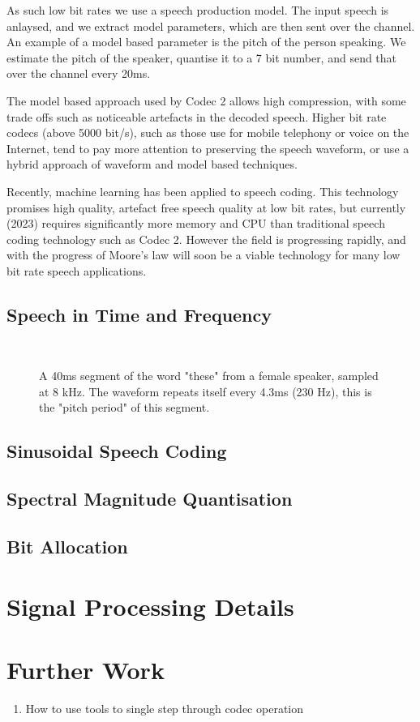 \documentclass{article}
\begin{document}
As such low bit rates we use a speech production model.  The input speech is anlaysed, and we extract model parameters, which are then sent over the channel.  An example of a model based parameter is the pitch of the person speaking.  We estimate the pitch of the speaker, quantise it to a 7 bit number, and send that over the channel every 20ms.

The model based approach used by Codec 2 allows high compression, with some trade offs such as noticeable artefacts in the decoded speech.  Higher bit rate codecs (above 5000 bit/s), such as those use for mobile telephony or voice on the Internet, tend to pay more attention to preserving the speech waveform, or use a hybrid approach of waveform and model based techniques.

Recently, machine learning has been applied to speech coding.  This technology promises high quality, artefact free speech quality at low bit rates, but currently (2023) requires significantly more memory and CPU than traditional speech coding technology such as Codec 2.  However the field is progressing rapidly, and with the progress of Moore's law will soon be a viable technology for many low bit rate speech applications.

\subsection{Speech in Time and Frequency}

\begin{figure}
\caption{ A 40ms segment of the word "these" from a female speaker, sampled at 8 kHz. The waveform repeats itself every 4.3ms (230 Hz), this is the "pitch period" of this segment.}
\label{fig:hts2a_time}
\begin{center}

\\

\end{center}
\end{figure}

\subsection{Sinusoidal Speech Coding}

\subsection{Spectral Magnitude Quantisation}

\subsection{Bit Allocation}

\section{Signal Processing Details}
\label{sect:details}

\section{Further Work}

\begin{enumerate}
\item How to use tools to single step through codec operation
\end{enumerate}
\cite{griffin1988multiband}



\end{document}
